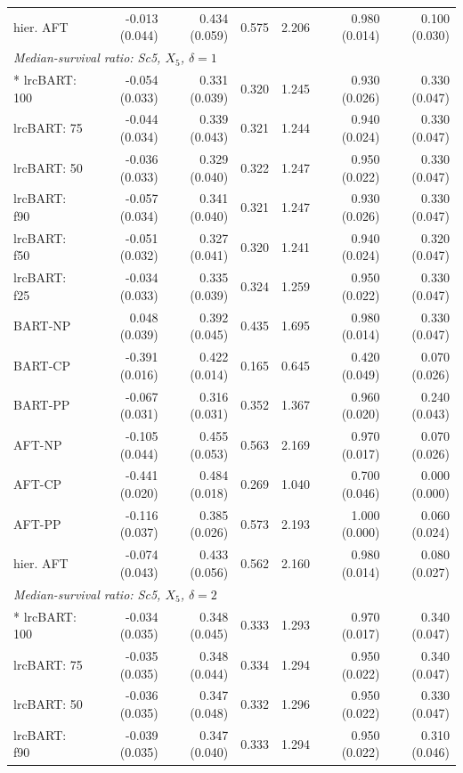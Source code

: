 \begin{landscape}
\begin{longtable}{lrrrrrr}
hier. AFT & -0.013 (0.044) & 0.434 (0.059) & 0.575 & 2.206 & 0.980 (0.014) & 0.100 (0.030) \\
\multicolumn{7}{l}{\strut\textit{Median-survival ratio: Sc5, $X_5$, $\delta=1$}}\\*
lrcBART: 100 & -0.054 (0.033) & 0.331 (0.039) & 0.320 & 1.245 & 0.930 (0.026) & 0.330 (0.047) \\
lrcBART: 75 & -0.044 (0.034) & 0.339 (0.043) & 0.321 & 1.244 & 0.940 (0.024) & 0.330 (0.047) \\
lrcBART: 50 & -0.036 (0.033) & 0.329 (0.040) & 0.322 & 1.247 & 0.950 (0.022) & 0.330 (0.047) \\
lrcBART: f90 & -0.057 (0.034) & 0.341 (0.040) & 0.321 & 1.247 & 0.930 (0.026) & 0.330 (0.047) \\
lrcBART: f50 & -0.051 (0.032) & 0.327 (0.041) & 0.320 & 1.241 & 0.940 (0.024) & 0.320 (0.047) \\
lrcBART: f25 & -0.034 (0.033) & 0.335 (0.039) & 0.324 & 1.259 & 0.950 (0.022) & 0.330 (0.047) \\
BART-NP & 0.048 (0.039) & 0.392 (0.045) & 0.435 & 1.695 & 0.980 (0.014) & 0.330 (0.047) \\
BART-CP & -0.391 (0.016) & 0.422 (0.014) & 0.165 & 0.645 & 0.420 (0.049) & 0.070 (0.026) \\
BART-PP & -0.067 (0.031) & 0.316 (0.031) & 0.352 & 1.367 & 0.960 (0.020) & 0.240 (0.043) \\
AFT-NP & -0.105 (0.044) & 0.455 (0.053) & 0.563 & 2.169 & 0.970 (0.017) & 0.070 (0.026) \\
AFT-CP & -0.441 (0.020) & 0.484 (0.018) & 0.269 & 1.040 & 0.700 (0.046) & 0.000 (0.000) \\
AFT-PP & -0.116 (0.037) & 0.385 (0.026) & 0.573 & 2.193 & 1.000 (0.000) & 0.060 (0.024) \\
hier. AFT & -0.074 (0.043) & 0.433 (0.056) & 0.562 & 2.160 & 0.980 (0.014) & 0.080 (0.027) \\
\multicolumn{7}{l}{\strut\textit{Median-survival ratio: Sc5, $X_5$, $\delta=2$}}\\*
lrcBART: 100 & -0.034 (0.035) & 0.348 (0.045) & 0.333 & 1.293 & 0.970 (0.017) & 0.340 (0.047) \\
lrcBART: 75 & -0.035 (0.035) & 0.348 (0.044) & 0.334 & 1.294 & 0.950 (0.022) & 0.340 (0.047) \\
lrcBART: 50 & -0.036 (0.035) & 0.347 (0.048) & 0.332 & 1.296 & 0.950 (0.022) & 0.330 (0.047) \\
lrcBART: f90 & -0.039 (0.035) & 0.347 (0.040) & 0.333 & 1.294 & 0.950 (0.022) & 0.310 (0.046) \\

\end{longtable}
\end{landscape}
